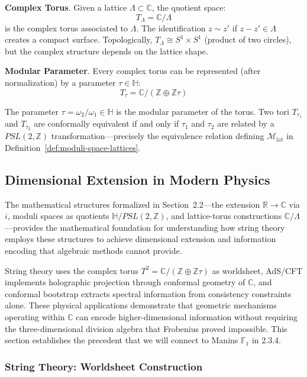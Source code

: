     \textbf{Complex Torus}. Given a lattice $\Lambda \subset \mathbb{C}$, the quotient space:
    \[
        T_\Lambda = \mathbb{C}/\Lambda
    \]
    is the complex torus associated to $\Lambda$. The identification $z \sim z'$ if $z - z' \in \Lambda$ creates a compact surface. Topologically, $T_\Lambda \cong S^1 \times S^1$ (product of two circles), but the complex structure depends on the lattice shape.

\textbf{Modular Parameter}. Every complex torus can be represented (after normalization) by a parameter $\tau \in \mathbb{H}$:
\[
    T_\tau = \mathbb{C}/(\mathbb{Z} \oplus \mathbb{Z}\tau)
\]

The parameter $\tau = \omega_2/\omega_1 \in \mathbb{H}$ is the modular parameter of the torus. Two tori $T_{\tau_1}$ and $T_{\tau_2}$ are conformally equivalent if and only if $\tau_1$ and $\tau_2$ are related by a $PSL(2,\mathbb{Z})$ transformation—precisely the equivalence relation defining $\mathcal{M}_{\text{lat}}$ in Definition~\ref{def:moduli-space-lattices}.

\subsection{Dimensional Extension in Modern Physics} \label{sec:dimensional-extension}

The mathematical structures formalized in Section~2.2—the extension $\mathbb{R} \to \mathbb{C}$ via $i$, moduli spaces as quotients $\mathbb{H}/PSL(2,\mathbb{Z})$, and lattice-torus constructions $\mathbb{C}/\Lambda$—provides the mathematical foundation for understanding how string theory employs these structures to achieve dimensional extension and information encoding that algebraic methods cannot provide.

String theory uses the complex torus $T^2 = \mathbb{C}/(\mathbb{Z} \oplus \mathbb{Z}\tau)$ as worldsheet, AdS/CFT \cite{Maldacena1998} implements holographic projection through conformal geometry of $\mathbb{C}$, and conformal bootstrap extracts spectral information from consistency constraints alone. These physical applications demonstrate that geometric mechanisms operating within $\mathbb{C}$ can encode higher-dimensional information without requiring the three-dimensional division algebra that Frobenius proved impossible. This section establishes the precedent that we will connect to Manins $\mathbb{F}_1$ in 2.3.4.

\subsubsection{String Theory: Worldsheet Construction}

